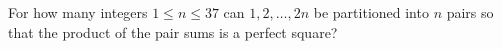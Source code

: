 For how many integers $1\le n\le37$ can $1,2,\ldots,2n$ be partitioned into $n$ pairs so that the product of the pair sums is a perfect square?
